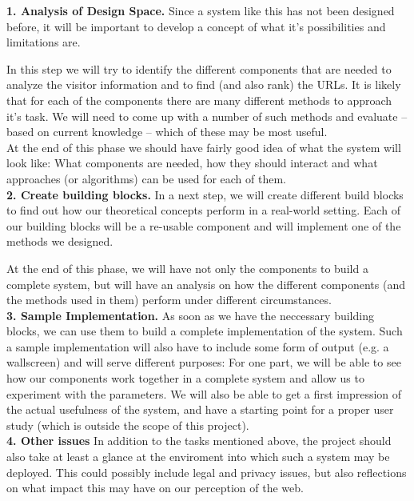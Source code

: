 \documentclass[a4paper]{danarticle}
\begin{document}
    \textbf{1. Analysis of Design Space.} Since a system like this
    has not been designed before, it will be important to 
    develop a concept of what it's possibilities and limitations are.
    
    In this step we will try to identify the different components that are
    needed to analyze the visitor information and to find (and  also rank) the
    URLs. It is likely that for each of the components there are many different
    methods to approach it's task. We will need to come up with a number of such
    methods and evaluate --  based on current knowledge -- 
    which of these may be most useful.
    \\
    At the end of this phase we should have fairly good idea of what the system
    will look like: What components are needed, how they should interact and
    what approaches (or algorithms) can be used for each of them.
    \\
    
    \textbf{2. Create building blocks.} In a next step, we will create
    different build blocks to find out how our theoretical 
    concepts perform in a real-world setting. Each of our building blocks  will
    be a re-usable component and will implement one of the methods we designed.
    
    At the end of this phase, we will have not only the components to build a
    complete system, but will have an analysis on  how the different 
    components (and the methods used in them) perform under different
    circumstances.
    \\
    
    \textbf{3. Sample Implementation.} As soon as we have the neccessary
    building blocks, we can use them to build a complete implementation of the
    system. Such a sample implementation will also have to include some form of
    output (e.g. a wallscreen) and will serve different purposes: For one part,
    we will be able to see how our components work together in a complete
    system and allow us to experiment with the parameters. We will also be able
    to get a first impression of the actual usefulness of the system, and have a
    starting point for a proper user study (which is outside the scope of this
    project).
    \\
    
    \textbf{4. Other issues}
    In addition to the tasks mentioned above, the project should also take
    at least a glance at the enviroment into which such a system may be
    deployed. This could possibly include legal and privacy issues, but 
    also reflections on what impact this may have on our perception of 
    the web.
\end{document}
